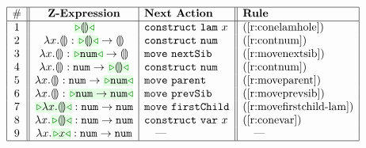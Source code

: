 \begin{figure}[t!]
\[
\begin{array}{|c||c|l||l|l|}
\hline
\# & \textbf{Z-Expression} & 
\textbf{Next Action} & \textbf{Rule}
\\
\hline
1 &
\zwsel{\hhole{}} & 
\aConstruct{\flam{x}} & 
\text{(\ref{r:conelamhole})}
\\ 2 &
\hlam{x}{\hhole{}} : \tarr{\zwsel{\hhole{}}}{\hhole{}} & 
\aConstruct{\fnum{}} &
\text{(\ref{r:contnum})}
\\ 3 &
\hlam{x}{\hhole{}} : \tarr{\zwsel{\tnum{}}}{\hhole{}} &
\aMove{\dNext{}} & 
\text{({\ref{r:movenextsib}})}
\\ 4 &
\hlam{x}{\hhole{}} : \tarr{\tnum}{\zwsel{\hhole{}}}
&
\aConstruct{\fnum{}} & 
\text{(\ref{r:contnum})}
\\ 5 &
\hlam{x}{\hhole{}} : \tarr{\tnum{}}{\zwsel{\tnum{}}} & 
\aMove{\dParent{}} & 
\text{(\ref{r:moveparent})}
\\ 6 &
\hlam{x}{\hhole{}} : \zwsel{\tarr{\tnum{}}{\tnum{}}}
&
\aMove{\dPrev{}} & 
\text{(\ref{r:moveprevsib})}
\\ 7 &
\zwsel{\hlam{x}{\hhole{}}} : \tarr{\tnum{}}{\tnum{}} & 
\aMove{\dChild{}} & 
\text{(\ref{r:movefirstchild-lam})}
\\ 8 &
\hlam{x}{\zwsel{\hhole{}}} : \tarr{\tnum{}}{\tnum{}} &
\aConstruct{\fvar{x}} & 
\text{(\ref{r:conevar})}
\\ 9 &
\hlam{x}{\zwsel{{x}}} : \tarr{\tnum{}}{\tnum{}} &
\quad\textrm{---}
&
\quad\textrm{---}
\\
\hline

\end{array}\]
\end{figure}
